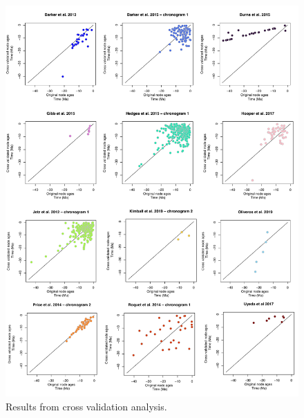 \documentclass[
  english,
  man]{apa6}
\begin{document}
\begin{figure}[!h]
\includegraphics{../figures/figure-cross-validation/fig-cross-validation-xy-plots.pdf}
\caption{Results from cross validation analysis.}
\label{fig:cvXY}
\end{figure}
\end{document}
